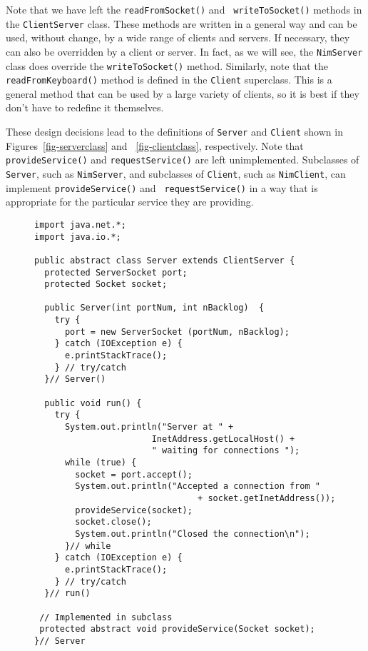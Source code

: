 Note that we have left the {\tt readFromSocket()} and {\tt
writeToSocket()} methods in the {\tt ClientServer} class. These
methods are written in a general way and can be used, without change,
by a wide range of clients and servers.  If necessary, they can also
be overridden by a client or server. In fact, as we will see, the
{\tt NimServer} class does override the {\tt writeToSocket()} method.
Similarly, note that the {\tt readFromKeyboard()} method is defined in
the {\tt Client} superclass.  This is a general method that
can be used by a large variety of clients, so it is best if they don't
have to redefine it themselves.

These design decisions lead to the definitions of {\tt Server} and
{\tt Client} shown in Figures~\ref{fig-serverclass} and
~\ref{fig-clientclass}, respectively. Note that {\tt provideService()}
and {\tt requestService()} are left unimplemented.  Subclasses of {\tt
Server}, such as {\tt NimServer}, and subclasses of {\tt Client}, such
as {\tt NimClient}, can implement {\tt provideService()} and {\tt
requestService()} in a way that is appropriate for the particular
service they are providing.


\begin{figure}[htb]
\jjjprogstart
\begin{jjjlisting}[27pc]
\begin{lstlisting}
import java.net.*;
import java.io.*;

public abstract class Server extends ClientServer {
  protected ServerSocket port;
  protected Socket socket;

  public Server(int portNum, int nBacklog)  {
    try {
      port = new ServerSocket (portNum, nBacklog);
    } catch (IOException e) {
      e.printStackTrace();
    } // try/catch
  }// Server()

  public void run() {
    try {
      System.out.println("Server at " + 
                       InetAddress.getLocalHost() +
                       " waiting for connections ");
      while (true) {
        socket = port.accept();
        System.out.println("Accepted a connection from " 
                                + socket.getInetAddress());
        provideService(socket);
        socket.close();
        System.out.println("Closed the connection\n");
      }// while
    } catch (IOException e) {
      e.printStackTrace();
    } // try/catch 
  }// run()

 // Implemented in subclass
 protected abstract void provideService(Socket socket);  
}// Server
\end{lstlisting}
\end{jjjlisting}
\end{figure}


